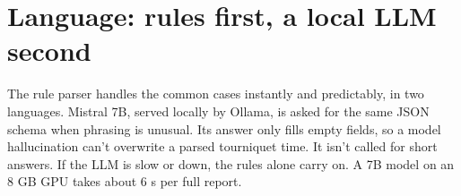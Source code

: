 \section{Language: rules first, a local LLM second}

The rule parser handles the common cases instantly and predictably, in two languages. Mistral 7B, served locally by
Ollama, is asked for the same JSON schema when phrasing is unusual. Its answer only fills empty fields, so a model
hallucination can't overwrite a parsed tourniquet time. It isn't called for short answers. If the LLM is slow or down,
the rules alone carry on. A 7B model on an 8 GB GPU takes about 6 s per full report.
